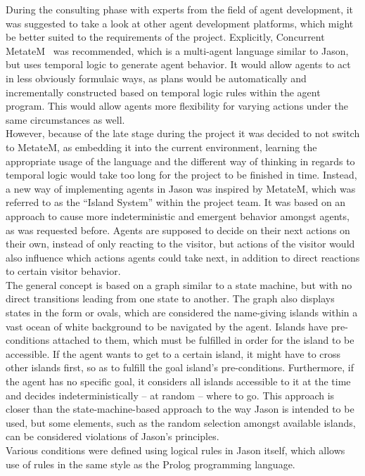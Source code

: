 \documentclass[draft,final]{vutinfth} %
\begin{document}
During the consulting phase with experts from the field of agent development, it was suggested to take a look at other agent development platforms, which might be better suited to the requirements of the project.
Explicitly, Concurrent MetateM~\cite{Barringer1995} was recommended, which is a multi-agent language similar to Jason, but uses temporal logic to generate agent behavior. 
It would allow agents to act in less obviously formulaic ways, as plans would be automatically and incrementally constructed based on temporal logic rules within the agent program. 
This would allow agents more flexibility for varying actions under the same circumstances as well. \\
However, because of the late stage during the project it was decided to not switch to MetateM, as embedding it into the current environment, learning the appropriate usage of the language and the different way of thinking in regards to temporal logic would take too long for the project to be finished in time. 
Instead, a new way of implementing agents in Jason was inspired by MetateM, which was referred to as the “Island System” within the project team. 
It was based on an approach to cause more indeterministic and emergent behavior amongst agents, as was requested before. 
Agents are supposed to decide on their next actions on their own, instead of only reacting to the visitor, but actions of the visitor would also influence which actions agents could take next, in addition to direct reactions to certain visitor behavior. \\
The general concept is based on a graph similar to a state machine, but with no direct transitions leading from one state to another. 
The graph also displays states in the form or ovals, which are considered the name-giving islands within a vast ocean of white background to be navigated by the agent. 
Islands have pre-conditions attached to them, which must be fulfilled in order for the island to be accessible. 
If the agent wants to get to a certain island, it might have to cross other islands first, so as to fulfill the goal island’s pre-conditions. 
Furthermore, if the agent has no specific goal, it considers all islands accessible to it at the time and decides indeterministically – at random – where to go. 
This approach is closer than the state-machine-based approach to the way Jason is intended to be used, but some elements, such as the random selection amongst available islands, can be considered violations of Jason’s principles. \\
Various conditions were defined using logical rules in Jason itself, which allows use of rules in the same style as the Prolog programming language. 
\end{document}
